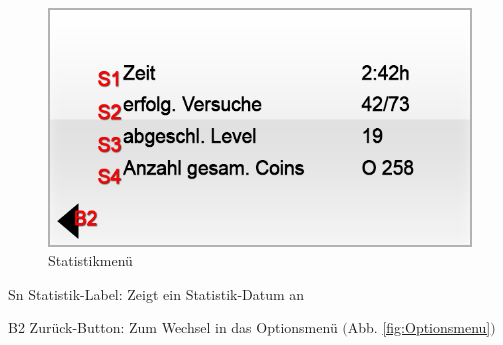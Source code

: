 \begin{figure}[H]
\centering
\includegraphics[scale=0.55]{../gui/_jpeg_numeration/stat.jpg}
\caption{Statistikmenü}
\label{fig:Statistikmenu}
\end{figure}
\begin{description*}
\item[Sn] Statistik-Label: Zeigt ein Statistik-Datum an
\item[B2] Zurück-Button: Zum Wechsel in das Optionsmenü $($Abb. \ref{fig:Optionsmenu}$)$
\end{description*}


